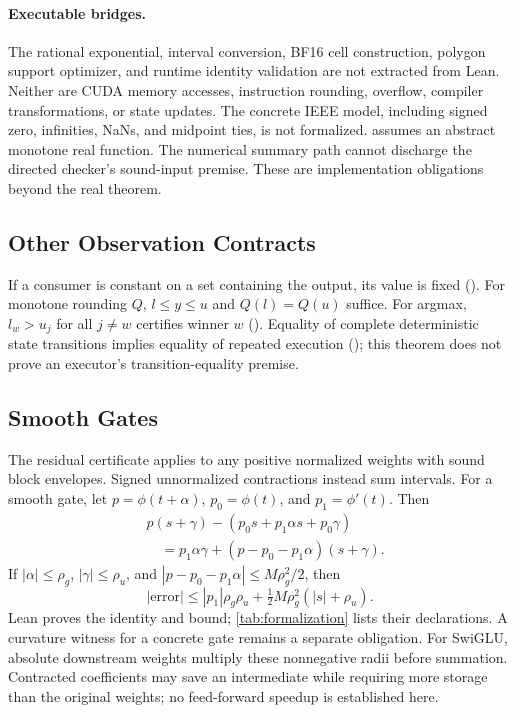 \FloatBarrier
\paragraph{Executable bridges.}
The rational exponential, interval conversion, BF16 cell construction,
polygon support optimizer, and runtime identity validation are not extracted
from Lean. Neither are CUDA memory accesses, instruction rounding, overflow,
compiler transformations, or state updates. The concrete IEEE model, including
signed zero, infinities, NaNs, and midpoint ties, is not formalized.
 assumes an abstract monotone real function.
The numerical summary path cannot discharge the directed checker's sound-input
premise. These are implementation obligations beyond the real theorem.

\FloatBarrier
\subsection{Other Observation Contracts}
If a consumer is constant on a set containing the output, its value is fixed
(). For monotone rounding $Q$,
$l\leq y\leq u$ and $Q(l)=Q(u)$ suffice. For argmax, $l_w>u_j$ for all $j\ne w$
certifies winner $w$ (). Equality of complete deterministic
state transitions implies equality of repeated execution
(); this theorem does not prove an executor's
transition-equality premise.

\FloatBarrier
\subsection{Smooth Gates}
The residual certificate applies to any positive normalized weights with
sound block envelopes. Signed unnormalized contractions instead sum intervals.
For a smooth gate, let
$p=\phi(t+\alpha)$, $p_0=\phi(t)$, and $p_1=\phi'(t)$. Then
\begin{equation}
 \begin{split}
 &p(s+\gamma)-(p_0s+p_1\alpha s+p_0\gamma)\\
 &\quad=p_1\alpha\gamma+(p-p_0-p_1\alpha)(s+\gamma).
 \end{split}
 \label{eq:gate-identity}
\end{equation}
If $|\alpha|\leq\rho_g$, $|\gamma|\leq\rho_u$, and
$|p-p_0-p_1\alpha|\leq M\rho_g^2/2$, then
\begin{equation}
 |\mathrm{error}|\leq |p_1|\rho_g\rho_u
       +\tfrac12M\rho_g^2(|s|+\rho_u).
\end{equation}
Lean proves the identity and bound; \cref{tab:formalization} lists their declarations.
A curvature witness for a concrete gate remains a separate obligation.
For SwiGLU, absolute downstream weights multiply these nonnegative radii
before summation. Contracted coefficients may save an intermediate while
requiring more storage than the original weights; no feed-forward speedup
is established here.

\FloatBarrier
